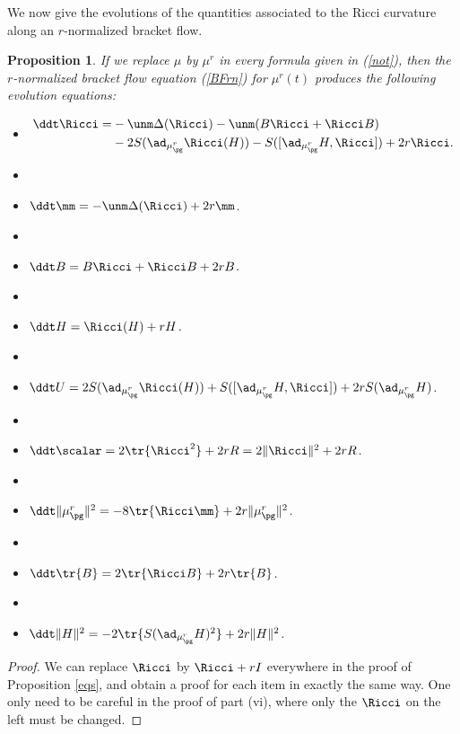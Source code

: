 \documentclass[11pt]{amsart}
\theoremstyle{plain}
\newtheorem{proposition}[theorem]{Proposition}
\theoremstyle{definition}
\theoremstyle{remark}
\begin{document}
We now give the evolutions of the quantities associated to the Ricci curvature along an $r$-normalized bracket flow.

\begin{proposition}\label{eqsrn}
If we replace $\mu$ by $\mu^r$ in every formula given in {\rm (\ref{not})}, then the $r$-normalized bracket flow equation {\rm (\ref{BFrn})} for $\mu^r(t)$ produces the following evolution equations:
\begin{itemize}
\item[(i)] \begin{align*} \ddt\Ricci=&-\unm\Delta(\Ricci)-\unm(B\Ricci+\Ricci B) \\ &- 2S(\ad_{\mu_{\pg}^r}{\Ricci(H)}) - S([\ad_{\mu_{\pg}^r}{H},\Ricci]) + 2r\Ricci.\end{align*}
\item[ ]
\item[(ii)] $\ddt\mm=-\unm\Delta(\Ricci) + 2r\mm$.
\item[ ]
\item[(iii)] $\ddt B=B\Ricci+\Ricci B + 2rB$.
\item[ ]
\item[(iv)] $\ddt H=\Ricci(H) + rH$.
\item[ ]
\item[(v)] $\ddt U= 2S(\ad_{\mu_{\pg}^r}{\Ricci(H)}) + S([\ad_{\mu_{\pg}^r}{H},\Ricci]) + 2rS(\ad_{\mu_{\pg}^r}{H})$.
\item[ ]
\item[(vi)] $\ddt\scalar=2\tr{\Ricci^2} + 2rR = 2\|\Ricci\|^2 + 2rR$.
\item[ ]
\item[(vii)] $\ddt\|\mu_{\pg}^r\|^2=-8\tr{\Ricci\mm} + 2r\|\mu_{\pg}^r\|^2$.
\item[ ]
\item[(viii)] $\ddt\tr{B}=2\tr{\Ricci B} + 2r\tr{B}$.
\item[ ]
\item[(ix)] $\ddt\| H\|^2=-2\tr{S(\ad_{\mu_{\pg}^r}{H})^2} + 2r\| H\|^2$.
\end{itemize}
\end{proposition}

\begin{proof}
We can replace $\Ricci$ by $\Ricci+rI$ everywhere in the proof of Proposition \ref{eqs}, and obtain a proof for each item in exactly the same way.  One only need to be careful in the proof of part (vi), where only the $\Ricci$ on the left must be changed.
\end{proof}
\end{document}
